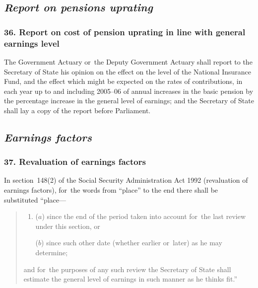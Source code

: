 \documentclass[12pt,a4paper]{article}
\begin{document}


\subsection{\itshape Report on pensions uprating}

\subsubsection{36. Report on cost of pension uprating in line with general earnings level}

The Government Actuary or~the Deputy Government Actuary shall report to the Secretary of State his opinion on the effect on the level of the National Insurance Fund, and the effect which might be expected on the rates of contributions, in each year up to and including 2005--06 of annual increases in the basic pension by the percentage increase in the general level of earnings; and the Secretary of State shall lay a copy of the report before Parliament.

\subsection{\itshape Earnings factors}

\subsubsection{37. Revaluation of earnings factors}

In section~148(2)  of the Social Security Administration Act 1992 (revaluation of earnings factors), for~the words from “place” to the end there shall be substituted “place—
\begin{quotation}
\begin{enumerate}\item[]\noindent
($a$) since the end of the period taken into account for~the last review under this section, or

($b$) since such other date (whether earlier or~later) as he may determine;
\end{enumerate}\noindent
and for~the purposes of any such review the Secretary of State shall estimate the general level of earnings in such manner as he thinks fit.”
\end{quotation}
\end{document}
